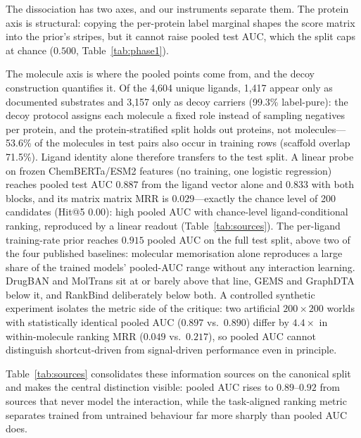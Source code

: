 \documentclass[11pt,a4paper]{article}
\newcommand{\method}{RankBind\xspace}
\newcommand{\mrr}{matrix MRR}
\begin{document}
The dissociation has two axes, and our instruments separate them. The
protein axis is structural: copying the per-protein label marginal shapes
the score matrix into the prior's stripes, but it cannot raise pooled test
AUC, which the split caps at chance ($0.500$, Table~\ref{tab:phase1}).

The molecule axis is where the pooled points come from, and the decoy
construction quantifies it. Of the 4{,}604 unique ligands, 1{,}417 appear
only as documented substrates and 3{,}157 only as decoy carriers
(99.3\% label-pure): the decoy protocol assigns each molecule a fixed
role instead of sampling negatives per protein, and the protein-stratified
split holds out proteins, not molecules---53.6\% of the molecules in test
pairs also occur in training rows (scaffold overlap 71.5\%). Ligand
identity alone therefore transfers to the test split. A linear probe on
frozen ChemBERTa/ESM2 features (no training, one logistic regression)
reaches pooled test AUC $0.887$ from the ligand vector alone and $0.833$
with both blocks, and its matrix \mrr{} is $0.029$---exactly the chance
level of 200 candidates (Hit@5 $0.00$): high pooled AUC with
chance-level ligand-conditional ranking, reproduced by a linear readout
(Table~\ref{tab:sources}).
The per-ligand training-rate prior reaches $0.915$ pooled AUC on the full
test split, above two of the four published baselines: molecular
memorisation alone reproduces a large share of the trained models'
pooled-AUC range without any interaction learning. DrugBAN and MolTrans
sit at or barely above that line, GEMS and GraphDTA below it, and
\method{} deliberately below both. A controlled synthetic experiment
isolates the metric side of the critique: two artificial $200\times200$
worlds with statistically identical pooled AUC ($0.897$ vs.\ $0.890$)
differ by $4.4\times$ in within-molecule ranking MRR ($0.049$ vs.\
$0.217$), so pooled AUC cannot distinguish shortcut-driven from
signal-driven performance even in principle.

Table~\ref{tab:sources} consolidates these information sources on the
canonical split and makes the central distinction visible: pooled AUC rises
to $0.89$--$0.92$ from sources that never model the interaction, while the
task-aligned ranking metric separates trained from untrained behaviour far
more sharply than pooled AUC does.
\end{document}
